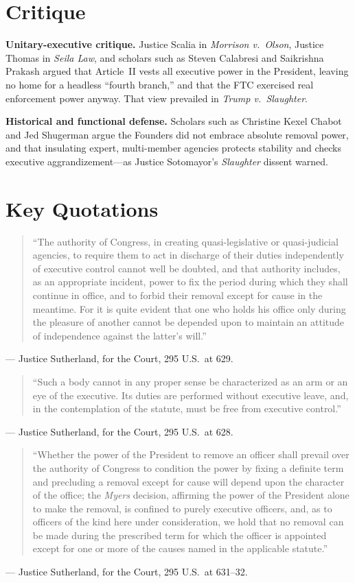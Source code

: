 \documentclass[12pt]{article}
\begin{document}
\section{Critique}

\textbf{Unitary-executive critique.} Justice Scalia in \textit{Morrison v.\ Olson}, Justice Thomas in \textit{Seila Law}, and scholars such as Steven Calabresi and Saikrishna Prakash argued that Article~II vests all executive power in the President, leaving no home for a headless ``fourth branch,'' and that the FTC exercised real enforcement power anyway. That view prevailed in \textit{Trump v.\ Slaughter}.

\textbf{Historical and functional defense.} Scholars such as Christine Kexel Chabot and Jed Shugerman argue the Founders did not embrace absolute removal power, and that insulating expert, multi-member agencies protects stability and checks executive aggrandizement---as Justice Sotomayor's \textit{Slaughter} dissent warned.

\section{Key Quotations}

\begin{quote}
``The authority of Congress, in creating quasi-legislative or quasi-judicial agencies, to require them to act in discharge of their duties independently of executive control cannot well be doubted, and that authority includes, as an appropriate incident, power to fix the period during which they shall continue in office, and to forbid their removal except for cause in the meantime. For it is quite evident that one who holds his office only during the pleasure of another cannot be depended upon to maintain an attitude of independence against the latter's will.''
\end{quote}
\noindent --- Justice Sutherland, for the Court, 295 U.S.\ at 629.

\begin{quote}
``Such a body cannot in any proper sense be characterized as an arm or an eye of the executive. Its duties are performed without executive leave, and, in the contemplation of the statute, must be free from executive control.''
\end{quote}
\noindent --- Justice Sutherland, for the Court, 295 U.S.\ at 628.

\begin{quote}
``Whether the power of the President to remove an officer shall prevail over the authority of Congress to condition the power by fixing a definite term and precluding a removal except for cause will depend upon the character of the office; the \textit{Myers} decision, affirming the power of the President alone to make the removal, is confined to purely executive officers, and, as to officers of the kind here under consideration, we hold that no removal can be made during the prescribed term for which the officer is appointed except for one or more of the causes named in the applicable statute.''
\end{quote}
\noindent --- Justice Sutherland, for the Court, 295 U.S.\ at 631--32.
\end{document}
